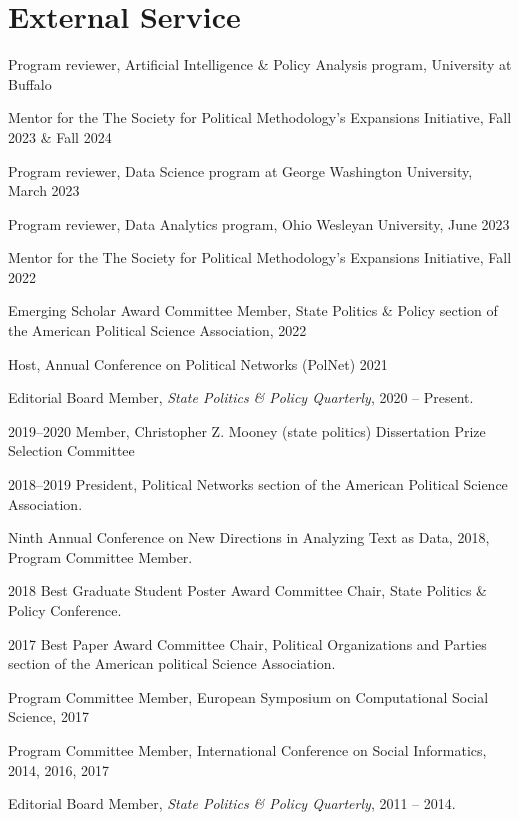 \documentclass[overlapped,line]{res}
\begin{document}
\begin{resume}
\begin{etaremune}
\end{etaremune}



\section{\bf External Service}
\vspace{.41cm} 
\begin{etaremune}
\item Program reviewer, Artificial Intelligence \& Policy Analysis program, University at Buffalo
\item Mentor for the The Society for Political Methodology’s Expansions Initiative, Fall 2023 \& Fall 2024
\item Program reviewer, Data Science program at George Washington University, March 2023
\item Program reviewer, Data Analytics program, Ohio Wesleyan University, June 2023
\item Mentor for the The Society for Political Methodology’s Expansions Initiative, Fall 2022
\item Emerging Scholar Award Committee Member, State Politics \& Policy section of the American Political Science Association, 2022
\item Host, Annual Conference on Political Networks (PolNet) 2021
\item Editorial Board Member, {\em State Politics \& Policy Quarterly},  2020 -- Present.
\item  2019--2020 Member, Christopher Z. Mooney (state politics) Dissertation Prize Selection Committee
\item 2018--2019 President, Political Networks section of the American Political Science Association.
\item Ninth Annual Conference on New Directions in Analyzing Text as Data, 2018, Program Committee Member. 
\item 2018 Best Graduate Student Poster Award Committee Chair, State Politics \& Policy Conference.
\item 2017 Best Paper Award Committee Chair, Political Organizations and Parties section of the American political Science Association.
\item Program Committee Member, European Symposium on Computational Social Science, 2017
\item Program Committee Member, International Conference on Social Informatics, 2014, 2016, 2017
\item Editorial Board Member, {\em State Politics \& Policy Quarterly},  2011 -- 2014.

\end{etaremune}
\end{resume}
\end{document}
